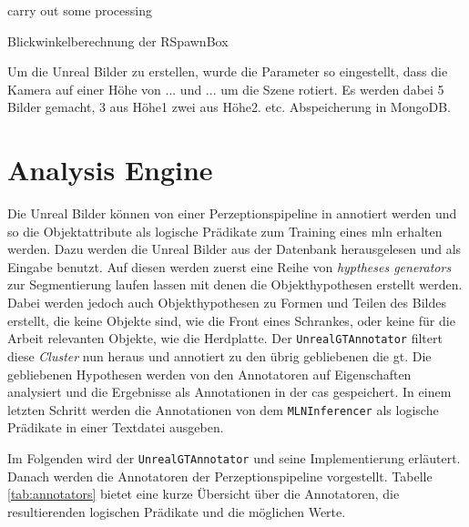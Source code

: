 \begin{algorithm}[H]
\begin{algorithmic}
\STATE carry out some processing
\ENDFOR
\end{algorithmic}
\caption{Blickwinkelberechnung der RSpawnBox}
\end{algorithm}

 \par

Um die Unreal Bilder zu erstellen, wurde die Parameter so eingestellt, dass die Kamera auf einer Höhe von ... und ... um die Szene rotiert. Es werden dabei 5 Bilder gemacht, 3 aus Höhe1 zwei aus Höhe2. etc.    Abspeicherung in MongoDB.

\section{Analysis Engine}
\label{sec:analysisengine}
Die Unreal Bilder können  von einer Perzeptionspipeline in \robosherlock annotiert werden und so die Objektattribute als logische Prädikate zum Training eines \gls{mln} erhalten werden. Dazu werden die Unreal Bilder aus der Datenbank herausgelesen und als Eingabe benutzt. Auf diesen werden zuerst eine Reihe von \textit{hyptheses generators} zur Segmentierung laufen lassen mit denen die Objekthypothesen erstellt werden. Dabei werden jedoch auch Objekthypothesen zu Formen und Teilen des Bildes erstellt, die keine Objekte sind, wie die Front eines Schrankes, oder keine für die Arbeit relevanten Objekte, wie die Herdplatte. Der \texttt{UnrealGTAnnotator} filtert diese \textit{Cluster} nun heraus und annotiert zu den übrig gebliebenen die \gls{gt}. Die gebliebenen Hypothesen werden von den Annotatoren auf Eigenschaften analysiert und die Ergebnisse als Annotationen in der \gls{cas} gespeichert. In einem letzten Schritt werden die Annotationen von dem \texttt{MLNInferencer} als logische Prädikate in einer Textdatei ausgeben. \par 

Im Folgenden wird der \texttt{UnrealGTAnnotator} und seine Implementierung erläutert. Danach werden die Annotatoren der Perzeptionspipeline vorgestellt. Tabelle \ref{tab:annotators} bietet eine kurze Übersicht über die Annotatoren, die resultierenden logischen Prädikate und die möglichen Werte.


